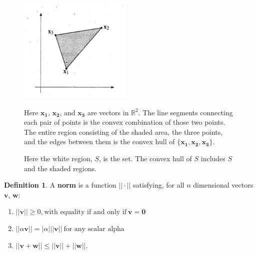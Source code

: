 \documentclass{article}
\theoremstyle{definition}
\newtheorem{definition}{Definition}[section]
\begin{document}
\begin{figure}[h]
    \centering
    \begin{minipage}{0.45\textwidth}
        \centering
        \includegraphics[height=5cm]{ConvexHull1.png}
        \caption{Here $\mathbf{x_1}$, $\mathbf{x_2}$, and $\mathbf{x_3}$ are vectors in $\mathbb{R}^2$. The line segments connecting each pair of points is the convex combination of those two points. The entire region consisting of the shaded area, the three points, and the edges between them is the convex hull of $\{\mathbf{x_1}, \mathbf{x_2}, \mathbf{x_3}\}$. \cite{sydsæter2005further}}
    \end{minipage}
    \hfill
    \begin{minipage}{0.45\textwidth}
        \centering
        \caption{Here the white region, $S$, is the set. The convex hull of $S$ includes $S$ and the shaded regions. \cite{sydsæter2005further}}
    \end{minipage}
\end{figure}
\begin{definition}
    A \textbf{norm} is a function \(||\cdot||\) satisfying, for all \(n\) dimensional vectors \(\mathbf{v}\), \(\mathbf{w}\):
    \begin{enumerate}
        \item $||\mathbf{v}|| \geq 0 \text{,} \ \text{with equality if and only if} \ \mathbf{v} = \mathbf{0}$
        \item $||\alpha\mathbf{v}|| = |\alpha| ||\mathbf{v}|| \ \text{for any scalar alpha}$
        \item $||\mathbf{v} + \mathbf{w}|| \leq ||\mathbf{v}|| + ||\mathbf{w}||$.
    \end{enumerate}
\end{definition}
\end{document}
